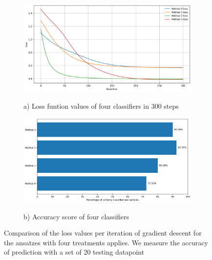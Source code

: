 \begin{figure}
    \begin{subfigure}{\textwidth}
        \includegraphics[width=\textwidth]{Artefact/Appendices/loss.png}
        \centerline{a) Loss funtion values of four classifiers in 300 steps}
    \end{subfigure}
    \begin{subfigure}{\textwidth}
        \includegraphics[width=\textwidth]{Artefact/Appendices/accuracy.png}
        \centerline{b) Accuracy score of four classifiers}
    \end{subfigure}

    \caption{
        Comparison of the loss values per iteration of gradient descent for the ansatzes with four treatments applies.
        We measure the accuracy of prediction with a set of 20 testing datapoint
    }
    \label{Fig: Plot Loss}
\end{figure}

